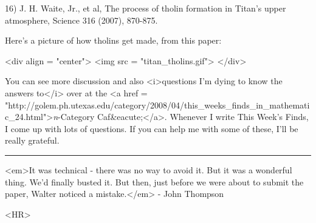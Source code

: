 16) J. H. Waite, Jr., et al, The process of tholin formation in 
Titan's upper atmosphere, Science 316 (2007), 870-875.

Here's a picture of how tholins get made, from this paper:

<div align = "center">
<img src = "titan_tholins.gif">
</div>

You can see more discussion and also <i>questions I'm dying to know
the answers to</i> over at the
<a href = "http://golem.ph.utexas.edu/category/2008/04/this_weeks_finds_in_mathematic_24.html">\emph{n}-Category Caf&eacute;</a>.  Whenever I 
write This Week's Finds, I come up with lots of questions.  If you
can help me with some of these, I'll be really grateful.

\par\noindent\rule{\textwidth}{0.4pt}
<em>It was technical - there was no way to avoid it.  But it was a 
wonderful thing.  We'd finally busted it.  But then, just before
we were about to submit the paper, Walter noticed a mistake.</em>
- John Thompson

<HR>



